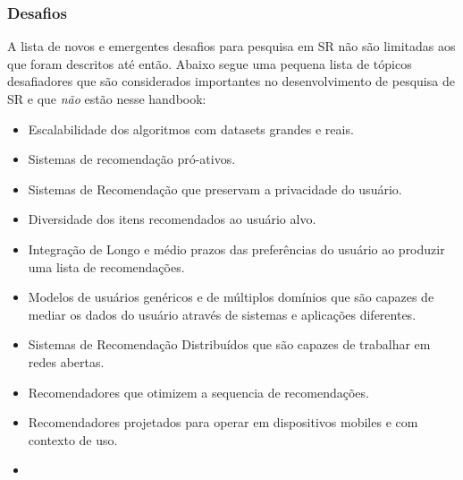 \subsubsection{Desafios}
A lista de novos e emergentes desafios para pesquisa em SR não são limitadas aos que foram descritos até então. Abaixo segue uma pequena lista de tópicos desafiadores que são considerados importantes no desenvolvimento de pesquisa de SR e que \emph{não} estão nesse handbook:

\begin{itemize}
  \item Escalabilidade dos algoritmos com datasets grandes e reais.
  \item Sistemas de recomendação pró-ativos.
  \item Sistemas de Recomendação que preservam a privacidade do usuário.
  \item Diversidade dos itens recomendados ao usuário alvo.
  \item Integração de Longo e médio prazos das preferências do usuário ao produzir uma lista de recomendações.
  \item Modelos de usuários genéricos e de múltiplos domínios que são capazes de mediar os dados do usuário através de sistemas e aplicações diferentes.
  \item Sistemas de Recomendação Distribuídos que são capazes de trabalhar em redes abertas.
  \item Recomendadores que otimizem a sequencia de recomendações.
  \item Recomendadores projetados para operar em dispositivos mobiles e com contexto de uso.
  \item
\end{itemize}
